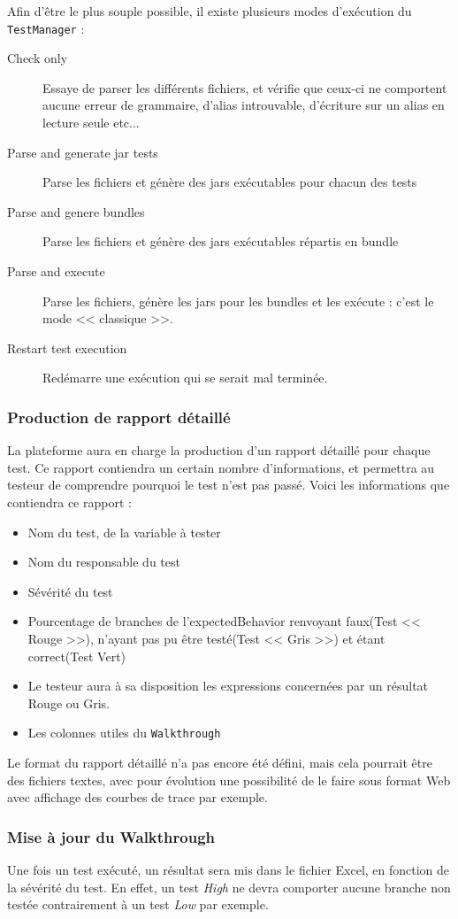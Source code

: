 	Afin d'être le plus souple possible, il existe plusieurs modes d'exécution du \texttt{TestManager} : 
	\begin{description}
		\item[Check only] Essaye de parser les différents fichiers, et vérifie que ceux-ci ne comportent aucune erreur de grammaire, d'alias introuvable, d'écriture sur un alias en lecture seule etc...
		\item[Parse and generate jar tests] Parse les fichiers et génère des jars exécutables pour chacun des tests
		\item[Parse and genere bundles] Parse les fichiers et génère des jars exécutables répartis en bundle
		\item[Parse and execute] Parse les fichiers, génère les jars pour les bundles et les exécute : c'est le mode << classique >>.
		\item[Restart test execution] Redémarre une exécution qui se serait mal terminée.
	\end{description}
	\subsubsection{Production de rapport détaillé}\label{report}
	La plateforme aura en charge la production d'un rapport détaillé pour chaque test. Ce rapport contiendra un certain nombre d'informations, et permettra au testeur de comprendre pourquoi le test n'est pas passé. Voici les informations que contiendra ce rapport : 

	\begin{itemize}
		\item Nom du test, de la variable à tester
		\item Nom du responsable du test
		\item Sévérité du test
		\item Pourcentage de branches de l'expectedBehavior renvoyant faux(Test << Rouge >>), n'ayant pas pu être testé(Test << Gris >>) et étant correct(Test Vert)
		\item Le testeur aura à sa disposition les expressions concernées par un résultat Rouge ou Gris.
		\item Les colonnes utiles du \texttt{Walkthrough}
	\end{itemize}

	Le format du rapport détaillé n'a pas encore été défini, mais cela pourrait être des fichiers textes, avec pour évolution une possibilité de le faire sous format Web avec affichage des courbes de trace par exemple.

	\subsubsection{Mise à jour du Walkthrough}
	Une fois un test exécuté, un résultat sera mis dans le fichier Excel, en fonction de la sévérité du test. En effet, un test \textit{High} ne devra comporter aucune branche non testée contrairement à un test \textit{Low} par exemple.
	
